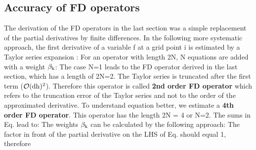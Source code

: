 \documentclass[11pt,onecolumn,oneside]{article}
\begin{document}
\subsection{Accuracy of FD operators}
The derivation of the FD operators in the last section was a simple replacement of the partial derivatives by finite differences. In the following more systematic approach, the first derivative of a variable f at a grid point i is estimated by a Taylor series expansion \cite{jastram:92a}:
For an operator with length 2N, N equations are added with a weight $\rm{\beta_k}$:
The case N=1 leads to the FD operator derived in the last section, which has a length of 2N=2. The Taylor series is truncated after the first term ($\rm{{\mathcal{O}}(\rm{dh})^{2}}$). 
Therefore this operator is called {\bf{2nd order FD operator}} which refers to the truncation error of the Taylor series and not to the order of the approximated derivative.
To understand equation  better, we estimate a {\bf{4th order FD operator}}. This operator has the length 2N = 4 or N=2. The sums in Eq.  lead to:
The weights $\rm{\beta_k}$ can be calculated by the following approach: 
The factor in front of the partial derivative on the LHS of Eq.  should equal 1, therefore
\end{document}
